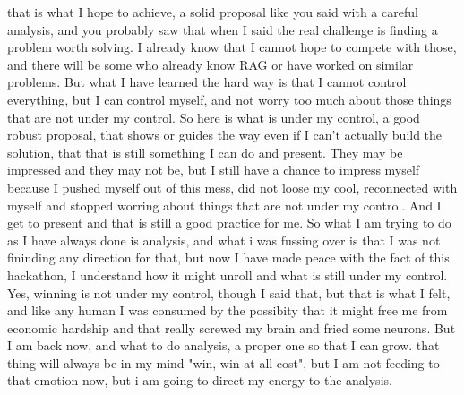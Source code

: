 \begin{userprompt}
that is what I hope to achieve, a solid proposal like you said with a careful analysis, and you probably saw that when I said the real challenge is finding a problem worth solving. I already know that I cannot hope to compete with those, and there will be some who already know RAG or have worked on similar problems. But what I have learned the hard way is that I cannot control everything, but I can control myself, and not worry too much about those things that are not under my control. So here is what is under my control, a good robust proposal, that shows or guides the way even if I can't actually build the solution, that that is still something I can do and present. They may be impressed and they may not be, but I still have a chance to impress myself because I pushed myself out of this mess, did not loose my cool, reconnected with myself and stopped worring about things that are not under my control. And I get to present and that is still a good practice for me. So what I am trying to do as I have always done is analysis, and what i was fussing over is that I was not fininding any direction for that, but now I have made peace with the fact of this hackathon, I understand how it might unroll and what is still under my control. Yes, winning is not under my control, though I said that, but that is what I felt, and like any human I was consumed by the possibity that it might free me from economic hardship and that really screwed my brain and fried some neurons. But I am back now, and what to do analysis, a proper one so that I can grow. that thing will always be in my mind "win, win at all cost", but I am not feeding to that emotion now, but i am going to direct my energy to the analysis.
\end{userprompt}

